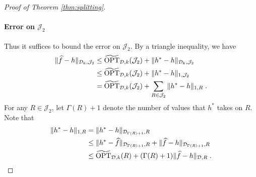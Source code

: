 \documentclass[final,12pt]{colt2018} %
\newcommand{\hier}{\mathcal{D}}
\newcommand{\calJ}{\mathcal{J}}
\newcommand{\fhat}{\widehat{f}}
\newcommand{\tOPT}{\widetilde{\OPT}}
\begin{document}
\begin{proof}[Proof of Theorem \ref{thm:splitting}]
\paragraph{Error on $\calJ_2$}
Thus it suffices to bound the error on $\calJ_2$.
By a triangle inequality, we have
\begin{align*}
\| \fhat - h \|_{\hier_k, \calJ_2} &\leq \tOPT_{\hier, k} (\calJ_2) + \| h^* - h \|_{\hier_k, \calJ_2} \\
&\leq  \tOPT_{\hier, k} (\calJ_2) + \| h^* - h \|_{1, \calJ_2} \\
&=  \tOPT_{\hier, k} (\calJ_2) + \sum_{R \in \calJ_2} \| h^* - h \|_{1, R} \; .
\end{align*}
For any $R \in \calJ_2$, let $\Gamma (R) + 1$ denote the number of values that $h^*$ takes on $R$.
Note that 
\begin{align*}
\| h^* - h \|_{1, R} &= \| h^* - h \|_{\hier_{\Gamma (R) + 1}, R} \\
&\leq \| h^* - \fhat \|_{\hier_{\Gamma (R) + 1}, R} + \| \fhat - h \|_{\hier_{\Gamma (R) + 1}, R} \\
&\leq \tOPT_{\hier, k} (R) + (\Gamma (R) + 1) \| \fhat - h \|_{\hier, R} \; .
\end{align*}


\end{proof}
\end{document}
